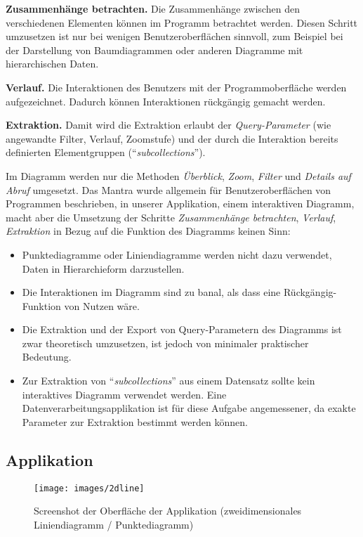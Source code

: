 \textbf{Zusammenhänge betrachten.} Die Zusammenhänge zwischen den verschiedenen Elementen können im Programm betrachtet werden. Diesen Schritt umzusetzen ist nur bei wenigen Benutzeroberflächen sinnvoll, zum Beispiel bei der Darstellung von Baumdiagrammen oder anderen Diagramme mit hierarchischen Daten.

\textbf{Verlauf.} Die Interaktionen des Benutzers mit der Programmoberfläche werden aufgezeichnet. Dadurch können Interaktionen rückgängig gemacht werden.

\textbf{Extraktion.} Damit wird die Extraktion erlaubt der \textit{Query-Parameter} (wie angewandte Filter, Verlauf, Zoomstufe) und der durch die Interaktion bereits definierten Elementgruppen ("`\textit{subcollections}"').

Im Diagramm werden nur die Methoden \textit{Überblick}, \textit{Zoom}, \textit{Filter} und \textit{Details auf Abruf} umgesetzt. Das Mantra wurde allgemein für Benutzeroberflächen von Programmen beschrieben, in unserer Applikation, einem interaktiven Diagramm, macht aber die Umsetzung der Schritte \textit{Zusammenhänge betrachten}, \textit{Verlauf}, \textit{Extraktion} in Bezug auf die Funktion des Diagramms keinen Sinn:

\begin{itemize}
	\item Punktediagramme oder Liniendiagramme werden nicht dazu verwendet, Daten in Hierarchieform darzustellen.
	\item Die Interaktionen im Diagramm sind zu banal, als dass eine Rückgängig-Funktion von Nutzen wäre.
	\item Die Extraktion und der Export von Query-Parametern des Diagramms ist zwar theoretisch umzusetzen, ist jedoch von minimaler praktischer Bedeutung.
	\item Zur Extraktion von "`\textit{subcollections}"' aus einem Datensatz sollte kein interaktives Diagramm verwendet werden. Eine Datenverarbeitungsapplikation ist für diese Aufgabe angemessener, da exakte Parameter zur Extraktion bestimmt werden können.
\end{itemize}

\newpage

\subsection{Applikation}

\begin{figure}[!htbp]
	\centering
	\texttt{[image: images/2dline]}
	\caption{Screenshot der Oberfläche der Applikation (zweidimensionales Liniendiagramm / Punktediagramm)}
	\label{fig:scatterplot}
\end{figure}

